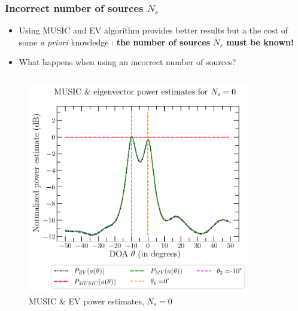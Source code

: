 \documentclass[UKenglish,8pt,aspectratio=1610]{beamer}
\begin{document}
\begin{frame}
	\frametitle{Incorrect number of sources $N_s$}
	\begin{itemize}
		\item Using MUSIC and EV algorithm provides better results but a the cost of some \textit{a priori} knowledge : \textbf{the number of sources $N_s$ must be known!}
		\item What happens when using an incorrect number of sources? 
	\end{itemize}

	\begin{columns}
	\begin{column}{0.33\textwidth}
	\begin{figure}[h!]
		\vspace{-15pt}
		\centering
		\includegraphics[scale=0.3]{question7/part_A_question_7_number_of_sources_+Ns=0.pdf}
		\caption{MUSIC \& EV power estimates, $N_s=0$}
	\end{figure}
	\end{column}
	\begin{column}{0.33\textwidth}
\begin{figure}[h!]
	\vspace{-15pt}
	\centering

\end{figure}
\end{column}
\end{columns}
\end{frame}
\end{document}
